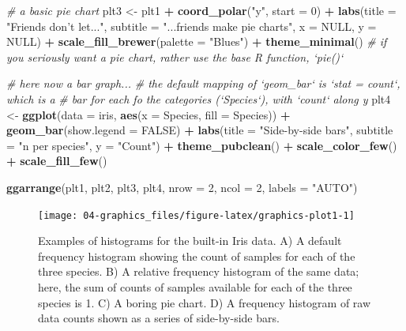 \documentclass[english,10pt,a4paper,oneside]{book}
\newenvironment{Shaded}{\begin{snugshade}}{\end{snugshade}}
\newcommand{\CommentTok}[1]{\textcolor[rgb]{0.56,0.35,0.01}{\textit{#1}}}
\newcommand{\DataTypeTok}[1]{\textcolor[rgb]{0.13,0.29,0.53}{#1}}
\newcommand{\DecValTok}[1]{\textcolor[rgb]{0.00,0.00,0.81}{#1}}
\newcommand{\KeywordTok}[1]{\textcolor[rgb]{0.13,0.29,0.53}{\textbf{#1}}}
\newcommand{\NormalTok}[1]{#1}
\newcommand{\OperatorTok}[1]{\textcolor[rgb]{0.81,0.36,0.00}{\textbf{#1}}}
\newcommand{\OtherTok}[1]{\textcolor[rgb]{0.56,0.35,0.01}{#1}}
\newcommand{\StringTok}[1]{\textcolor[rgb]{0.31,0.60,0.02}{#1}}
\theoremstyle{definition}
\theoremstyle{definition}
\theoremstyle{definition}
\theoremstyle{remark}
\begin{document}
\begin{Shaded}
\begin{Highlighting}[]
\CommentTok{# a basic pie chart}
\NormalTok{plt3 <-}\StringTok{ }\NormalTok{plt1 }\OperatorTok{+}\StringTok{ }\KeywordTok{coord_polar}\NormalTok{(}\StringTok{"y"}\NormalTok{, }\DataTypeTok{start =} \DecValTok{0}\NormalTok{) }\OperatorTok{+}
\StringTok{  }\KeywordTok{labs}\NormalTok{(}\DataTypeTok{title =} \StringTok{"Friends don't let..."}\NormalTok{, }\DataTypeTok{subtitle =} \StringTok{"...friends make pie charts"}\NormalTok{,}
       \DataTypeTok{x =} \OtherTok{NULL}\NormalTok{, }\DataTypeTok{y =} \OtherTok{NULL}\NormalTok{) }\OperatorTok{+}
\StringTok{  }\KeywordTok{scale_fill_brewer}\NormalTok{(}\DataTypeTok{palette =} \StringTok{"Blues"}\NormalTok{) }\OperatorTok{+}
\StringTok{  }\KeywordTok{theme_minimal}\NormalTok{()}
\CommentTok{# if you seriously want a pie chart, rather use the base R function, `pie()`}

\CommentTok{# here now a bar graph...}
\CommentTok{# the default mapping of `geom_bar` is `stat = count`, which is a}
\CommentTok{# bar for each fo the categories (`Species`), with `count` along y}
\NormalTok{plt4 <-}\StringTok{ }\KeywordTok{ggplot}\NormalTok{(}\DataTypeTok{data =}\NormalTok{ iris, }\KeywordTok{aes}\NormalTok{(}\DataTypeTok{x =}\NormalTok{ Species, }\DataTypeTok{fill =}\NormalTok{ Species)) }\OperatorTok{+}
\StringTok{  }\KeywordTok{geom_bar}\NormalTok{(}\DataTypeTok{show.legend =} \OtherTok{FALSE}\NormalTok{) }\OperatorTok{+}
\StringTok{  }\KeywordTok{labs}\NormalTok{(}\DataTypeTok{title =} \StringTok{"Side-by-side bars"}\NormalTok{, }\DataTypeTok{subtitle =} \StringTok{"n per species"}\NormalTok{, }\DataTypeTok{y =} \StringTok{"Count"}\NormalTok{) }\OperatorTok{+}
\StringTok{ }\KeywordTok{theme_pubclean}\NormalTok{() }\OperatorTok{+}\StringTok{ }\KeywordTok{scale_color_few}\NormalTok{() }\OperatorTok{+}
\StringTok{  }\KeywordTok{scale_fill_few}\NormalTok{()}

\KeywordTok{ggarrange}\NormalTok{(plt1, plt2, plt3, plt4, }\DataTypeTok{nrow =} \DecValTok{2}\NormalTok{, }\DataTypeTok{ncol =} \DecValTok{2}\NormalTok{, }\DataTypeTok{labels =} \StringTok{"AUTO"}\NormalTok{)}
\end{Highlighting}
\end{Shaded}

\begin{figure}
\texttt{[image: 04-graphics\_files/figure-latex/graphics-plot1-1]} \caption{Examples of histograms for the built-in Iris data. A) A default frequency histogram showing the count of samples for each of the three species. B) A relative frequency histogram of the same data; here, the sum of counts of samples available for each of the three species is 1. C) A boring pie chart. D) A frequency histogram of raw data counts shown as a series of side-by-side bars.}\label{fig:graphics-plot1}
\end{figure}
\end{document}
